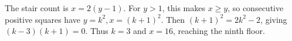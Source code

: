 The stair count is $x=2(y-1)$. For $y>1$, this makes $x\ge y$, so consecutive positive squares have $y=k^2,x=(k+1)^2$. Then $(k+1)^2=2k^2-2$, giving $(k-3)(k+1)=0$. Thus $k=3$ and $\boxed{x=16}$, reaching the ninth floor.

